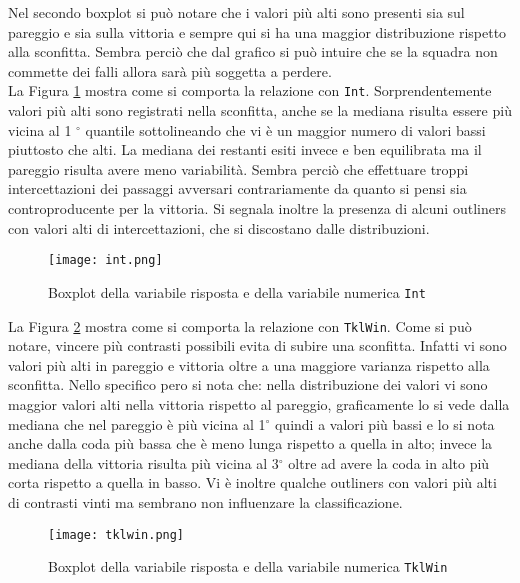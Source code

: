 Nel secondo boxplot si può notare che i valori più alti sono presenti sia sul pareggio e sia sulla vittoria e sempre qui si ha una maggior distribuzione rispetto alla sconfitta. Sembra perciò che dal grafico si può intuire che se la squadra non commette dei falli allora sarà più soggetta a perdere.\\

La Figura \ref{fig:int} mostra come si comporta la relazione con \texttt{Int}. Sorprendentemente valori più alti sono registrati nella sconfitta, anche se la mediana risulta essere più vicina al 1 $^{\circ}$ quantile sottolineando che vi è un maggior numero di valori bassi piuttosto che alti. La mediana dei restanti esiti invece e ben equilibrata ma il pareggio risulta avere meno variabilità. Sembra perciò che effettuare troppi intercettazioni dei passaggi avversari contrariamente da quanto si pensi sia controproducente per la vittoria. Si segnala inoltre la presenza di alcuni outliners con valori alti di intercettazioni, che si discostano dalle distribuzioni.\\

\begin{figure}[htbp]
	\begin{center}
		\texttt{[image: int.png]}
		\caption{Boxplot della variabile risposta e della variabile numerica \texttt{Int}} \label{fig:int}
	\end{center}
\end{figure}

La Figura \ref{fig:tkl} mostra come si comporta la relazione con \texttt{TklWin}. Come si può notare, vincere più contrasti possibili evita di subire una sconfitta. Infatti vi sono valori più alti in pareggio e vittoria oltre a una maggiore varianza rispetto alla sconfitta. Nello specifico pero si nota che: nella distribuzione dei valori vi sono maggior valori alti nella vittoria rispetto al pareggio, graficamente lo si vede dalla mediana che nel pareggio è più vicina al 1$^{\circ}$ quindi a valori più bassi e lo si nota anche dalla coda più bassa che è meno lunga rispetto a quella in alto; invece la mediana della vittoria risulta più vicina al 3$^{\circ}$ oltre ad avere la coda in alto più corta rispetto a quella in basso. Vi è inoltre qualche outliners con valori più alti di contrasti vinti ma sembrano non influenzare la classificazione.\\

\begin{figure}[htbp]
	\begin{center}
		\texttt{[image: tklwin.png]}
		\caption{Boxplot della variabile risposta e della variabile numerica \texttt{TklWin}} \label{fig:tkl}
	\end{center}
\end{figure}

